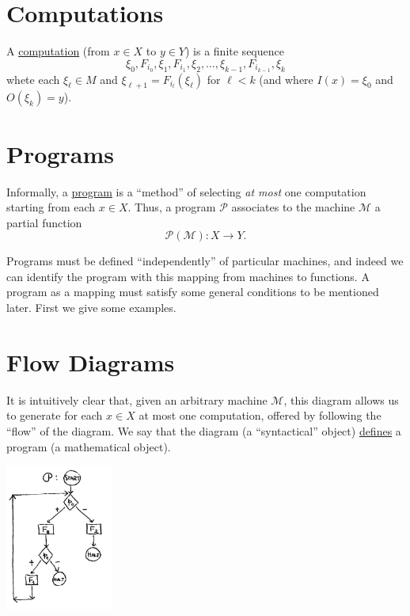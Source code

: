 \documentclass{article}
\newcommand{\scM}{\mathscr{M}}
\newcommand{\scP}{\mathscr{P}}
\begin{document}
\section{Computations}

A \underline{computation} (from $x \in X$ to $y \in Y$) is a finite sequence 
\begin{equation*}
    \xi_0, F_{i_0}, \xi_1, F_{i_1}, \xi_2, \ldots, \xi_{k-1}, F_{i_{k-1}}, \xi_k
\end{equation*}
whete each $\xi_\ell \in M$ and $\xi_{\ell+1} = F_{i_l}(\xi_\ell)$ for $\ell < k$ (and where $I(x) = \xi_0$ and $O(\xi_k) = y$).

\section{Programs}

Informally, a \underline{program} is a ``method'' of selecting \textit{at most} one computation starting from each $x \in X$. Thus, a program $\scP$ associates to the machine $\scM$ a partial function 
\begin{equation*}
    \scP(\scM) : X \to Y.
\end{equation*}

Programs must be defined ``independently'' of particular machines, and indeed we can identify the program with this mapping from machines to functions. A program as a mapping must satisfy some general conditions to be mentioned later. First we give some examples. 

\section{Flow Diagrams}

It is intuitively clear that, given an arbitrary machine $\scM$, this diagram allows us to generate for each $x \in X$ at most one computation, offered by following the ``flow'' of the diagram. We say that the diagram (a ``syntactical'' object) \underline{defines} a program (a mathematical object). 

\begin{center}
    \includegraphics[width=100pt]{dg2.png}
\end{center}
\end{document}
